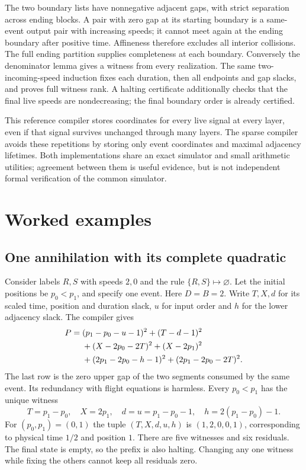 \documentclass[11pt,letterpaper]{article}
\numberwithin{equation}{section}
\theoremstyle{definition}
\theoremstyle{remark}
\begin{document}
The two boundary lists have nonnegative adjacent gaps, with strict separation across ending blocks. A pair with zero gap at its starting boundary is a same-event output pair with increasing speeds; it cannot meet again at the ending boundary after positive time. Affineness therefore excludes all interior collisions. The full ending partition supplies completeness at each boundary. Conversely the denominator lemma gives a witness from every realization. The same two-incoming-speed induction fixes each duration, then all endpoints and gap slacks, and proves full witness rank. A halting certificate additionally checks that the final live speeds are nondecreasing; the final boundary order is already certified.

This reference compiler stores coordinates for every live signal at every layer, even if that signal survives unchanged through many layers. The sparse compiler avoids these repetitions by storing only event coordinates and maximal adjacency lifetimes. Both implementations share an exact simulator and small arithmetic utilities; agreement between them is useful evidence, but is not independent formal verification of the common simulator.

\section{Worked examples}\label{smc:sd:sec:examples}
\subsection{One annihilation with its complete quadratic}
Consider labels $R,S$ with speeds $2,0$ and the rule $\{R,S\}\mapsto\varnothing$. Let the initial positions be $p_0<p_1$, and specify one event. Here $D=B=2$. Write $T,X,d$ for its scaled time, position and duration slack, $u$ for input order and $h$ for the lower adjacency slack. The compiler gives
\begin{align}\label{smc:sd:eq:annihilation}
 P={}&(p_1-p_0-u-1)^2+(T-d-1)^2\notag\\
 &+(X-2p_0-2T)^2+(X-2p_1)^2\notag\\
 &+(2p_1-2p_0-h-1)^2+(2p_1-2p_0-2T)^2.
\end{align}
The last row is the zero upper gap of the two segments consumed by the same event. Its redundancy with flight equations is harmless. Every $p_0<p_1$ has the unique witness
\[
 T=p_1-p_0,\quad X=2p_1,\quad d=u=p_1-p_0-1,
 \quad h=2(p_1-p_0)-1.
\]
For $(p_0,p_1)=(0,1)$ the tuple $(T,X,d,u,h)$ is $(1,2,0,0,1)$, corresponding to physical time $1/2$ and position $1$. There are five witnesses and six residuals. The final state is empty, so the prefix is also halting. Changing any one witness while fixing the others cannot keep all residuals zero.
\end{document}
